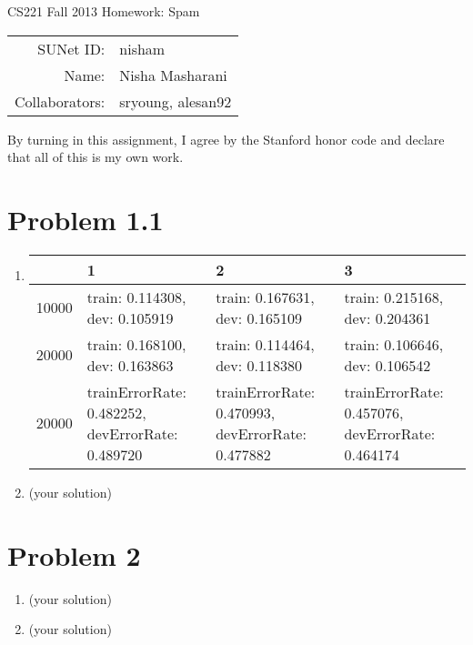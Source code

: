 \documentclass[12pt]{article}
\begin{document}
\begin{center}
{\Large CS221 Fall 2013 Homework: Spam}

\begin{tabular}{rl}
SUNet ID: & nisham \\
Name: & Nisha Masharani \\
Collaborators: & sryoung, alesan92
\end{tabular}
\end{center}

By turning in this assignment, I agree by the Stanford honor code and declare
that all of this is my own work.

\section*{Problem 1.1}

\begin{enumerate}[label=(\alph*)]
  \item 
  \begin{center}
	  \begin{tabular}{ l | p{2cm} | p{2cm} | p{2cm} }
	    \hline
	     & 1 & 2 & 3\\ \hline
	    10000 & train: 0.114308, dev: 0.105919 & train: 0.167631, dev: 0.165109 & train: 0.215168, dev: 0.204361 \\ \hline
	    20000 & train: 0.168100, dev: 0.163863 & train: 0.114464, dev: 0.118380 & train: 0.106646, dev: 0.106542 \\ \hline
	    20000 & trainErrorRate: 0.482252, devErrorRate: 0.489720 & trainErrorRate: 0.470993, devErrorRate: 0.477882 & trainErrorRate: 0.457076, devErrorRate: 0.464174 \\ \hline
	  \end{tabular}
	\end{center}

  \item (your solution)
\end{enumerate}

\section*{Problem 2}

\begin{enumerate}[label=(\alph*)]
  \item (your solution)
  \item (your solution)
\end{enumerate}
\end{document}

